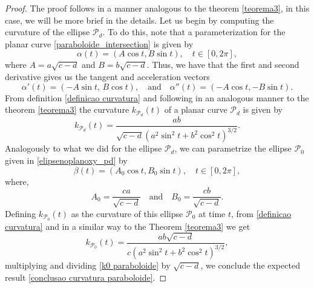 \documentclass{amsart}
\theoremstyle{plain}
\numberwithin{equation}{section}
\begin{document}
\begin{proof}
	
	The proof follows in a manner analogous to the theorem \ref{teorema3}, in this case, we will be more brief in the details. Let us begin by computing the curvature of the ellipse \( \mathcal{P}_d \). To do this, note that a parameterization for the planar curve  \eqref{paraboloide_intersection} is given by
	\begin{equation}\label{parametriza paraboloide Pd}
		\alpha(t) = (A \cos t, B \sin t), \quad t \in [0,2\pi],
	\end{equation}
	where $A = a\sqrt{c - d}$ and $B = b\sqrt{c - d}.$ Thus, we have that the first and second derivative gives us the tangent and acceleration vectors
	$$
	\alpha'(t) = (-A \sin t,\, B \cos t), \quad \text{and} \quad \alpha''(t) = (-A \cos t, -B \sin t).
	$$
	From definition \ref{definicao curvatura} and following in an analogous manner to the theorem \eqref{teorema3} the curvature $k_{\mathcal{P}_d}(t)$ of a planar curve $\mathcal{P}_d$ is given by
	\begin{equation}
		k_{\mathcal{P}_d}(t) = \dfrac{ab}{\sqrt{c-d} ( a^2 \sin^2 t + b^2 \cos^2 t )^{3/2} }.
	\end{equation}
	Analogously to what we did for the ellipse $\mathcal{P}_d$, we can parametrize the ellipse $\mathcal{P}_0$ given in \eqref{elipsenoplanoxy_pd} by
	\begin{equation}\label{parametriza elipse p0}
		\beta(t) = (A_0 \cos t, B_0 \sin t), \quad t \in [0,2\pi],
	\end{equation}
	where,
	$$
	A_0 = \dfrac{ca}{\sqrt{c - d}} \quad \text{and} \quad B_0 = \dfrac{cb}{\sqrt{c - d}}.
	$$
	Defining $k_{\mathcal{P}_0}(t)$ as the curvature of this ellipse $\mathcal{P}_0$ at time $t$, from \eqref{definicao curvatura} and in a similar way to the Theorem \ref{teorema3} we get
	\begin{equation}\label{k0 paraboloide}
		k_{\mathcal{P}_0}(t) = \dfrac{ab \sqrt{c-d}}{c ( a^2 \sin^2 t + b^2 \cos^2 t )^{3/2}},
	\end{equation}
	multiplying and dividing \eqref{k0 paraboloide} by $\sqrt{c-d}$, we conclude the expected result \eqref{conclusao curvatura paraboloide}.
	
\end{proof}


\vspace{0.5cm} 
\end{document}
